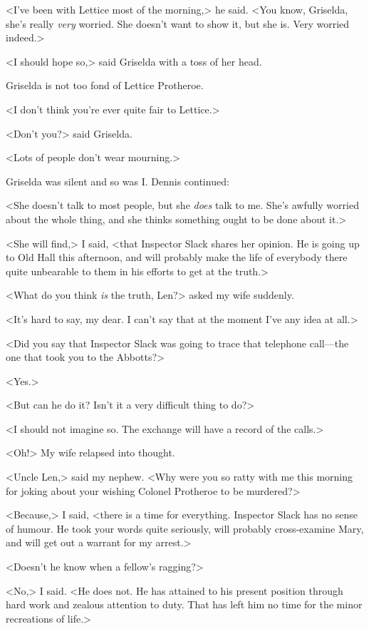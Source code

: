 <I've been with Lettice most of the morning,> he said. <You know, Griselda, she's really \emph{very} worried. She doesn't want to show it, but she is. Very worried indeed.>

<I should hope so,> said Griselda with a toss of her head.

Griselda is not too fond of Lettice Protheroe.

<I don't think you're ever quite fair to Lettice.>

<Don't you?> said Griselda.

<Lots of people don't wear mourning.>

Griselda was silent and so was I. Dennis continued:

<She doesn't talk to most people, but she \emph{does} talk to me. She's awfully worried about the whole thing, and she thinks something ought to be done about it.>

<She will find,> I said, <that Inspector Slack shares her opinion. He is going up to Old Hall this afternoon, and will probably make the life of everybody there quite unbearable to them in his efforts to get at the truth.>

<What do you think \emph{is} the truth, Len?> asked my wife suddenly.

<It's hard to say, my dear. I can't say that at the moment I've any idea at all.>

<Did you say that Inspector Slack was going to trace that telephone call—the one that took you to the Abbotts?>

<Yes.>

<But can he do it? Isn't it a very difficult thing to do?>

<I should not imagine so. The exchange will have a record of the calls.>

<Oh!> My wife relapsed into thought.

<Uncle Len,> said my nephew. <Why were you so ratty with me this morning for joking about your wishing Colonel Protheroe to be murdered?>

<Because,> I said, <there is a time for everything. Inspector Slack has no sense of humour. He took your words quite seriously, will probably cross-examine Mary, and will get out a warrant for my arrest.>

<Doesn't he know when a fellow's ragging?>

<No,> I said. <He does not. He has attained to his present position through hard work and zealous attention to duty. That has left him no time for the minor recreations of life.>

